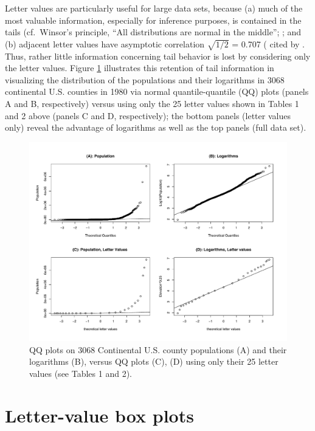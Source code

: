 \documentclass[oneside]{article}
\begin{document}
Letter values are particularly useful for large data sets,
because (a) much of the most valuable information, especially
for inference purposes, is contained in the tails
(cf.~Winsor's principle, ``All distributions are normal
in the middle'';  \citep[457]{tukey60}; and (b) adjacent
letter values have asymptotic correlation $\sqrt{1/2}$ = 0.707
(\citep{mosteller46} cited by \citet[51--52]{dchlv}.
Thus, rather little information concerning tail behavior
is lost by considering only the letter values.  Figure \ref{qqpop4}
illustrates this retention of tail information in visualizing the
distribution of the populations and their logarithms
in 3068 continental U.S. counties in 1980 via
normal quantile-quantile (QQ) plots (panels A and B, respectively)
versus using only the 25 letter values shown in Tables 1 and 2 above
(panels C and D, respectively); the bottom panels (letter values only)
reveal the advantage of logarithms as well as the top panels (full data set).

\begin{figure}[hbtp]
  \centering
  \includegraphics[scale=.5,angle=270]{qqpop4}

  \caption{QQ plots on 3068 Continental U.S. county populations (A) and their
  logarithms (B), versus QQ plots (C), (D) using only their 25 letter values
  (see Tables 1 and 2).}
  \label{qqpop4}
\end{figure}



\section{Letter-value box plots}
\label{sec:lv-boxplots}
\end{document}
